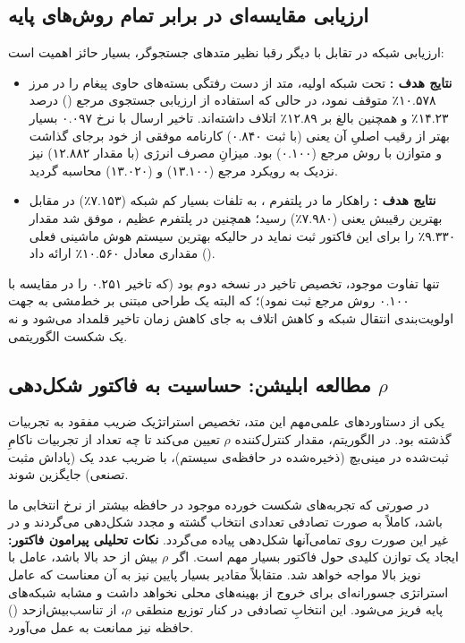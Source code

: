 \documentclass[oneside,openany,phd]{TMU-Thesis}
\begin{document}
\subsection{ارزیابی مقایسه‌ای در برابر تمام روش‌های پایه}

ارزیابی شبکه در تقابل با دیگر رقبا نظیر متدهای جستجوگر، بسیار حائز اهمیت است:
\begin{itemize}
    \item \textbf{نتایج هدف :} تحت شبکه اولیه، متد  از دست رفتگی بسته‌های حاوی پیغام را در مرز ۱۰.۵۷۸٪ متوقف نمود، در حالی که استفاده از ارزیابی جستجوی مرجع () درصد ۱۴.۲۳٪ و همچنین  بالغ بر ۱۲.۸۹٪ اتلاف داشته‌اند. تاخیر ارسال با نرخ ۰.۰۹۷ بسیار بهتر از رقیب اصلیِ آن یعنی  (با ثبت ۰.۸۴۰) کارنامه موفقی از خود برجای گذاشت و متوازن با روش مرجع (۰.۱۰۰) بود. میزانِ مصرف انرژی (با مقدار ۱۲.۸۸۲) نیز نزدیک به رویکرد مرجع (۱۳.۱۰۰) و  (۱۳.۰۲۰) محاسبه گردید.
    \item \textbf{نتایج هدف :} راهکار ما در پلتفرم ، به تلفات بسیار کم شبکه (۷.۱۵۳٪) در مقابل بهترین رقیبش یعنی  (۷.۹۸۰٪) رسید؛ همچنین در پلتفرم عظیم ، موفق شد مقدار ۹.۳۳۰٪ را برای این فاکتور ثبت نماید در حالیکه بهترین سیستم هوش ماشینی فعلی () مقداری معادل ۱۰.۵۶۰٪ ارائه داد.
\end{itemize}

تنها تفاوت موجود، تخصیص تاخیر در نسخه دوم بود (که  تاخیر ۰.۲۵۱ را در مقایسه با ۰.۱۰۰ روش مرجع ثبت نمود)؛ که البته یک طراحی مبتنی بر خط‌مشی به جهت اولویت‌بندی انتقال شبکه و کاهش اتلاف به جای کاهش زمان تاخیر قلمداد می‌شود و نه یک شکست الگوریتمی.

\subsection{مطالعه ابلیشن: حساسیت به فاکتور شکل‌دهی $\rho$}

یکی از دستاوردهای علمی‌مهم این متد، تخصیص استراتژیک ضریب مفقود به تجربیات گذشته بود. در الگوریتم، مقدار کنترل‌کننده $\rho$ تعیین می‌کند تا چه تعداد از تجربیات ناکامِ ثبت‌شده در مینی‌بچ (ذخیره‌شده در حافظه‌ی سیستم)، با ضریب عدد یک (پاداش مثبت تصنعی) جایگزین شوند. 

در صورتی که تجربه‌های شکست خورده موجود در حافظه بیشتر از نرخ انتخابی ما باشد، کاملاً به صورت تصادفی تعدادی انتخاب گشته و مجدد شکل‌دهی می‌گردند و در غیر این صورت روی تمامی‌آنها شکل‌دهی پیاده می‌گردد.
\textbf{نکات تحلیلی پیرامون فاکتور:}
ایجاد یک توازن کلیدی حول فاکتور بسیار مهم است. اگر $\rho$ بیش از حد بالا باشد، عامل با نویز بالا مواجه خواهد شد. متقابلاً مقادیر بسیار پایین نیز به آن معناست که عامل استراتژی جسورانه‌ای برای خروج از بهینه‌های محلی نخواهد داشت و مشابه شبکه‌های پایه فریز می‌شود. این انتخابِ تصادفی در کنار توزیع منطقی $\rho$، از تناسب‌بیش‌ازحد () حافظه نیز ممانعت به عمل می‌آورد.
\end{document}
